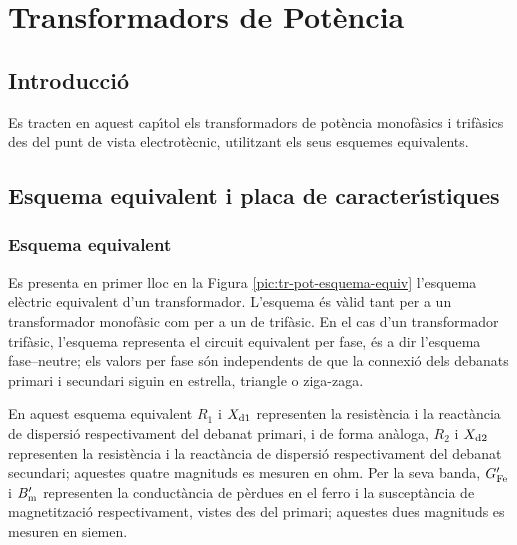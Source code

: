 \chapter{Transformadors de Pot\`{e}ncia}

\section{Introducci\'{o}}
Es tracten en aquest cap\'{\i}tol els transformadors de pot\`{e}ncia
monof\`{a}sics i trif\`{a}sics des del punt de vista electrot\`{e}cnic, utilitzant els seus esquemes equivalents.

\section{Esquema equivalent i placa de caracter\'{\i}stiques}

\subsection{Esquema equivalent}

Es presenta en primer lloc en la Figura \vref{pic:tr-pot-esquema-equiv} l'esquema el\`{e}ctric equivalent d'un transformador.
L'esquema \'{e}s v\`{a}lid tant per a un transformador monof\`{a}sic com per a un de trif\`{a}sic. En el cas d'un transformador trif\`{a}sic, l'esquema representa el circuit equivalent per fase, \'{e}s a dir l'esquema fase--neutre; els valors per fase s\'{o}n independents de que la connexi\'{o} dels debanats primari i secundari siguin en estrella, triangle o ziga-zaga.

\begin{center}
    
    \label{pic:tr-pot-esquema-equiv}
\end{center}

En aquest esquema equivalent $R_1$ i $X_\mathrm{d1}$ representen la resist\`{e}ncia i la react\`{a}ncia de dispersi\'{o} respectivament del debanat primari, i de forma an\`{a}loga, $R_2$ i $X_\mathrm{d2}$ representen la resist\`{e}ncia i la react\`{a}ncia de dispersi\'{o} respectivament del debanat secundari; aquestes quatre magnituds es mesuren en ohm. Per la seva banda, $G_\mathrm{Fe}'$ i $B_\mathrm{m}'$ representen la conduct\`{a}ncia de p\`{e}rdues en el ferro i la suscept\`{a}ncia de magnetitzaci\'{o} respectivament, vistes des del primari; aquestes dues magnituds es mesuren en siemen.

